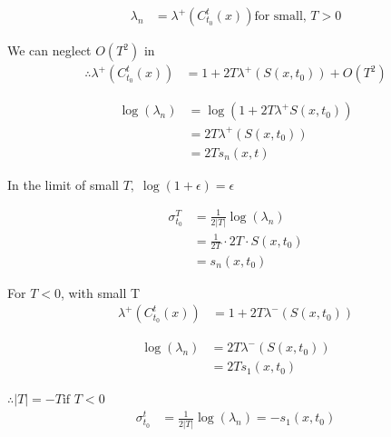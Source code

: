 \documentclass[../report.tex]{subfiles}
\begin{document}
\begin{equation}
  \begin{aligned}
    \lambda_n &= \lambda^+ (C_{t_0}^t (x)) \text{for small, } T > 0
  \end{aligned}
\end{equation}

We can neglect \(O(T^2)\) in
\begin{equation}
  \begin{aligned}
    \therefore \lambda^+ (C_{t_0}^t (x)) &= 1 + 2T \lambda^+ (S(x, t_0)) + O(T^2)
  \end{aligned}
\end{equation}

\begin{equation}
  \begin{aligned}
    \log(\lambda_n) &= \log(1 + 2T\lambda^+S(x, t_0)) \\
    &= 2T\lambda^+(S(x, t_0)) \\
    &= 2Ts_n(x, t)
  \end{aligned}
\end{equation}

In the limit of small \(T,\; \log(1+\epsilon) = \epsilon\)

\begin{equation}
  \begin{aligned}
    \sigma_{t_0}^T &= \frac{1}{2|T|}\log(\lambda_n) \\
    &= \frac{1}{2T} \cdot 2T \cdot S(x, t_0) \\
    &= s_n(x, t_0)
  \end{aligned}
\end{equation}

For \(T < 0\), with small T
\begin{equation}
  \begin{aligned}
    \lambda^+ (C_{t_0}^t(x)) &= 1 + 2T \lambda^- (S(x, t_0))
  \end{aligned}
\end{equation}

\begin{equation}
  \begin{aligned}
    \log(\lambda_n) &= 2T\lambda^- (S(x, t_0)) \\
    &= 2Ts_1(x, t_0)
  \end{aligned}
\end{equation}

\(\therefore |T| = -T \text{if } T < 0\)
\begin{equation}
  \begin{aligned}
    \sigma_{t_0}^t &= \frac{1}{2|T|} \log(\lambda_n) = -s_1(x, t_0)
  \end{aligned}
\end{equation}
\end{document}
